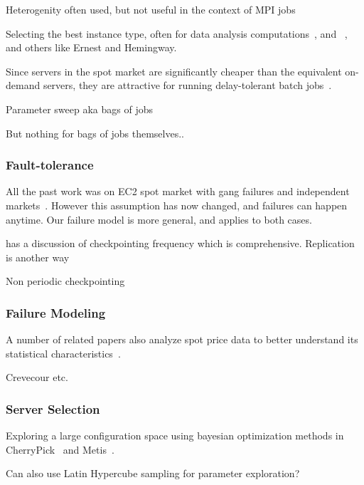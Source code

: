 Heterogenity often used, but not useful in the context of MPI jobs~\cite{exosphere}

Selecting the best instance type, often for data analysis computations~\cite{alipourfard_cherrypick}, and ~\cite{yadwadkar_selecting_2017}, and others like Ernest and Hemingway.


Since servers in the spot market are significantly cheaper than the
equivalent on-demand servers, they are attractive for running
delay-tolerant batch jobs~\cite{spoton, jain14demand, 
  yi2010reducing, conductor, liu-spot, spot-run, dubois2016optispot}. 

Parameter sweep aka bags of jobs ~\cite{casanova_heuristics_2000}

But nothing for bags of jobs themselves.. 


\subsubsection{Fault-tolerance}

All the past work was on EC2 spot market with gang failures and independent markets~\cite{marathe2014exploiting, gong_monetary_2015}.
However this assumption has now changed, and failures can happen anytime.
Our failure model is more general, and applies to both cases.



\cite{dongarra_fault_nodate} has a discussion of checkpointing frequency which is comprehensive. Replication is another way~\cite{walters_replication-based_2009}

Non periodic checkpointing~\cite{bougeret_checkpointing_2011}


\subsubsection{Failure Modeling}

A number of related papers also analyze spot price data to better understand its statistical  characteristics~\cite{bidding4,mihailescu2012impact,bidding7,bidding1,bidding8,bidding3,bidding6,bid-cloud,bidding5}.  


\cite{wolski_probabilistic_2017} \cite{guo_bidding_2015}



Crevecour etc. 



\subsubsection{Server Selection}
Exploring a large configuration space using bayesian optimization methods in CherryPick~\cite{alipourfard_cherrypick} and Metis~\cite{li2018metis}.

Can also use Latin Hypercube sampling for parameter exploration?





